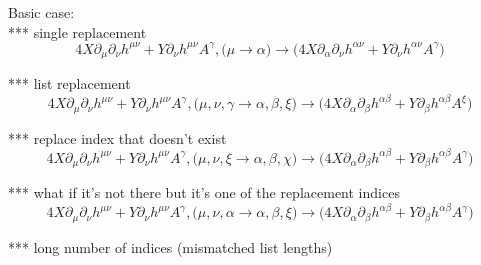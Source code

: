 \documentclass{article}
\def\){\Big)}
\def\({\Big(}
\begin{document}
Basic case:\\

*** single replacement
\begin{equation}
4X \partial_{\mu} \partial_{\nu}h^{\mu \nu} +Y \partial_{\nu}h^{\mu \nu} A^{\gamma} ,\( \mu \rightarrow \alpha \) \rightarrow 
\(4 X \partial_{\alpha}\partial_{\nu}h^{\alpha \nu} +Y \partial_{\nu}h^{\alpha \nu} A^{\gamma} \)
\end{equation}

*** list replacement
\begin{equation}
4X \partial_{\mu} \partial_{\nu}h^{\mu \nu} +Y \partial_{\nu}h^{\mu \nu} A^{\gamma} , \( \mu, \nu, \gamma \rightarrow \alpha, \beta, \xi \) \rightarrow 
 \(4 X \partial_{\alpha}\partial_{\beta}h^{\alpha \beta} +Y \partial_{\beta}h^{\alpha \beta} A^{\xi} \)
\end{equation}

*** replace index that doesn’t exist
\begin{equation}
4X \partial_{\mu} \partial_{\nu}h^{\mu \nu} +Y \partial_{\nu}h^{\mu \nu} A^{\gamma} , \( \mu, \nu, \xi \rightarrow \alpha, \beta, \chi \) \rightarrow 
\(4 X \partial_{\alpha}\partial_{\beta}h^{\alpha \beta} +Y \partial_{\beta}h^{\alpha \beta} A^{\gamma} \)
\end{equation}

*** what if it’s not there but it’s one of the replacement indices
\begin{equation}
4X \partial_{\mu} \partial_{\nu}h^{\mu \nu} +Y \partial_{\nu}h^{\mu \nu} A^{\gamma} , \( \mu, \nu, \alpha \rightarrow \alpha, \beta, \xi \) \rightarrow 
\(4 X \partial_{\alpha}\partial_{\beta}h^{\alpha \beta} +Y \partial_{\beta}h^{\alpha \beta} A^{\gamma} \)
\end{equation}

*** long number of indices (mismatched list lengths) 


\end{document}
